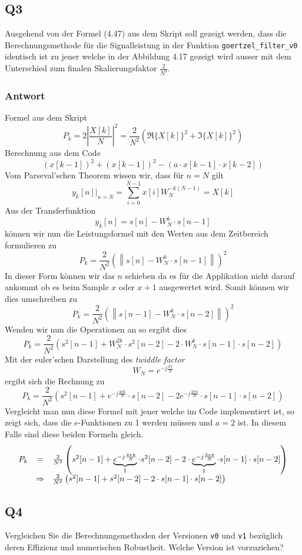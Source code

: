 \subsection{Q3}

Ausgehend von der Formel (4.47) aus dem Skript soll gezeigt werden, dass die
Berechnungsmethode für die Signalleistung in der Funktion
\lstinline{goertzel_filter_v0} identisch ist zu jener welche in der Abbildung
4.17 gezeigt wird ausser mit dem Unterschied zum finalen Skalierungsfaktor 
$\frac{2}{N^2}$.

\subsubsection*{Antwort}
Formel aus dem Skript
\[
	P_k
	= 2 \left| \frac{X[k]}{N} \right|^2
	= \frac{2}{N^2} \left( \Re\{X[k]\}^2 + \Im\{X[k]\}^2 \right)
\]
Berechnung aus dem Code
\[
	\left( x[k-1] \right)^2
		+ \left( x[k-1] \right)^2
		- \left( a \cdot x[k-1] \cdot x[k-2] \right)
\]
Vom Parseval'schen Theorem wissen wir, dass für $n = N$ gilt
\[
	y_k[n] |_{n=N}
	= \sum_{i=0}^{N-1} x[i] W_N^{-k(N-1)}
	= X[k]
\]
Aus der Transferfunktion
\[
	y_k[n] = s[n] - W_N^k \cdot s[n-1]
\]
können wir nun die Leistungsformel mit den Werten aus dem Zeitbereich
formulieren zu
\[
	P_k = \frac{2}{N^2} \left(
		\left\lVert s[n] - W_N^k \cdot s[n-1] \right\rVert
	\right)^2
\]
In dieser Form können wir das $n$ schieben da es für die Applikation
nicht darauf ankommt ob es beim Sample $x$ oder $x+1$ ausgewertet wird.
Somit können wir dies umschreiben zu
\[
	P_k = \frac{2}{N^2} \left(
		\left\lVert s[n-1] - W_N^k \cdot s[n-2] \right\rVert
	\right)^2
\]
Wenden wir nun die Operationen an so ergibt dies
\[
	P_k
	= \frac{2}{N^2} \left(
		s^2[n-1] + W_N^{2k} \cdot s^2[n-2]
		- 2 \cdot W_N^k \cdot s[n-1] \cdot s[n-2]
	\right)
\]
Mit der euler'schen Darstellung des \emph{twiddle factor}
\[
	W_N = e^{-j\frac{2 \pi}{N}}
\] 
ergibt sich die Rechnung zu
\[
	P_k
	= \frac{2}{N^2} \left(
		s^2[n-1] + e^{-j\frac{4 \pi k}{N}} \cdot s[n-2]
		- 2 e^{-j\frac{2 \pi k}{N}} \cdot s[n-1] \cdot s[n-2] 
	\right)
\]
Vergleicht man nun diese Formel mit jener welche im Code implementiert ist,
so zeigt sich, dass die $e$-Funktionen zu 1 werden müssen und $a=2$ ist. In
diesem Falle sind diese beiden Formeln gleich.
\[
	\begin{array}{r c l}
	P_k & = & \frac{2}{N^2} \left(
		s^2[n-1] +
		\underbrace{e^{-j\frac{4 \pi k}{N}}}_{1} \cdot s^2[n-2]
		- 2 \cdot \underbrace{e^{-j\frac{2 \pi k}{N}}}_{1} \cdot s[n-1] \cdot s[n-2] 
	\right) \\
	& \Rightarrow & \frac{2}{N^2} \left(
		s^2[n-1] + s^2[n-2] - 2 \cdot s[n-1] \cdot s[n-2] 
	\right)
	\end{array}
\]

\subsection{Q4}

Vergleichen Sie die Berechnungsmethoden der Versionen \lstinline{v0} und
\lstinline{v1} bezüglich deren Effizienz und numerischen Robustheit.
Welche Version ist vorzuziehen?

